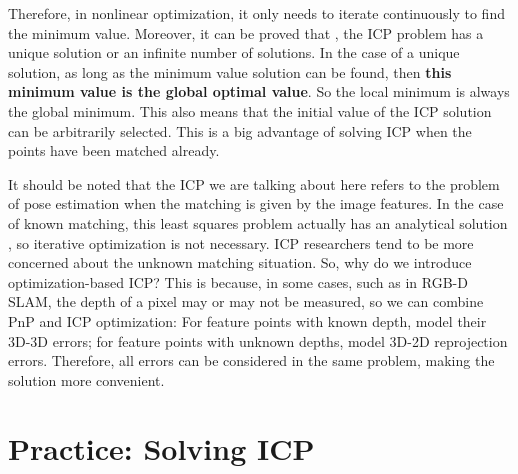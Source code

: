 Therefore, in nonlinear optimization, it only needs to iterate continuously to find the minimum value. Moreover, it can be proved that \textsuperscript{\cite{Barfoot2016}}, the ICP problem has a unique solution or an infinite number of solutions. In the case of a unique solution, as long as the minimum value solution can be found, then \textbf{this minimum value is the global optimal value}. So the local minimum is always the global minimum. This also means that the initial value of the ICP solution can be arbitrarily selected. This is a big advantage of solving ICP when the points have been matched already.

It should be noted that the ICP we are talking about here refers to the problem of pose estimation when the matching is given by the image features. In the case of known matching, this least squares problem actually has an analytical solution \textsuperscript{\cite{Faugeras1986, Horn1987, Sharp2002}}, so iterative optimization is not necessary. ICP researchers tend to be more concerned about the unknown matching situation. So, why do we introduce optimization-based ICP? This is because, in some cases, such as in RGB-D SLAM, the depth of a pixel may or may not be measured, so we can combine PnP and ICP optimization: For feature points with known depth, model their 3D-3D errors; for feature points with unknown depths, model 3D-2D reprojection errors. Therefore, all errors can be considered in the same problem, making the solution more convenient.

\section{Practice: Solving ICP}
